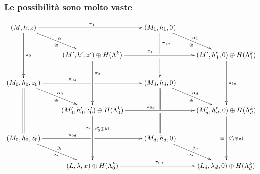 \documentclass[svgnames,%
	ucs,%
	pdftex]{guitbeamer}
\begin{document}
\begin{frame}
  \frametitle{Le possibilit\`a sono molto vaste}
	\tiny\vspace{-.08\textheight}
	\[\xymatrix{
	(M,h,z) \ar[dd]^{\pi_0} \ar[dr]^\alpha_\cong \ar[rr]^{\pi_1}
	&& (M_1,h_1,0) \ar'[d]^-{\pi_{1d}}[dd] \ar[dr]^{\alpha_1}_\cong
	\\
	& (M',h',z')\oplus H(\Lambda^k) \ar[dd]^<(.25){\pi_0} \ar[rr]^<(.25){\pi_1}
	&& (M'_1,h'_1,0)\oplus H(\Lambda_1^k) \ar[dd]^{\pi_{1d}}
	\\
	(M_0,h_0,z_0) \ar@{=}[dd] \ar[dr]^{\alpha_0}_\cong \ar'[r]^<(.6){\pi_{0d}}[rr]
	&& (M_d,h_d,0) \ar@{=}'[d][dd] \ar[dr]^{\alpha_d}_\cong
	\\
	& (M'_0,h'_0,z'_0)\oplus H(\Lambda_0^k) \ar[dd]^<(.25){\beta'_0\oplus\text{id}}_<(.25)\cong
	\ar[rr]^<(.25){\pi_{0d}}
	&& (M'_d,h'_d,0)\oplus H(\Lambda_d^k) \ar[dd]^{\beta'_d\oplus\text{id}}_\cong
	\\
	(M_0,h_0,z_0) \ar[dr]^{\beta_0}_\cong \ar'[r]^<(.6){\pi_{0d}}[rr]
	&& (M_d,h_d,0) \ar[dr]^{\beta_d}_\cong
	\\
	& (L,\lambda,x)\oplus H(\Lambda_0^k) \ar[rr]^{\pi_{0d}}
	&& (L_d,\lambda_d,0)\oplus H(\Lambda_d^k)
	}\]
\end{frame}
\end{document}
